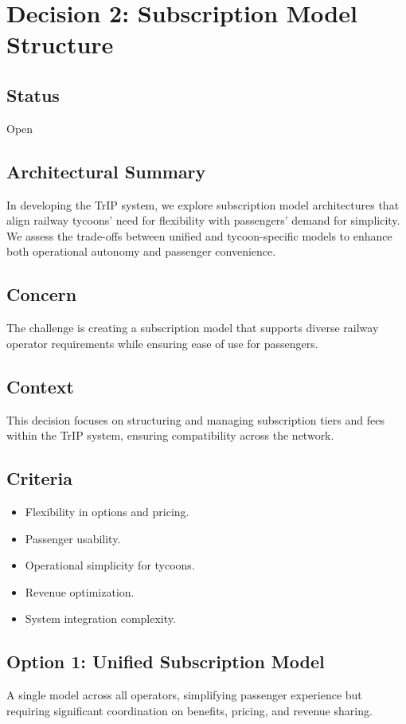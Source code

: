 \section*{Decision 2: Subscription Model Structure}

\subsection*{Status}
Open

\subsection*{Architectural Summary}
In developing the TrIP system, we explore subscription model architectures that align railway tycoons' need for flexibility with passengers' demand for simplicity. We assess the trade-offs between unified and tycoon-specific models to enhance both operational autonomy and passenger convenience.

\subsection*{Concern}
The challenge is creating a subscription model that supports diverse railway operator requirements while ensuring ease of use for passengers.

\subsection*{Context}
This decision focuses on structuring and managing subscription tiers and fees within the TrIP system, ensuring compatibility across the network.

\subsection*{Criteria}
\begin{itemize}
\item Flexibility in options and pricing.
\item Passenger usability.
\item Operational simplicity for tycoons.
\item Revenue optimization.
\item System integration complexity.
\end{itemize}

\subsection*{Option 1: Unified Subscription Model}
A single model across all operators, simplifying passenger experience but requiring significant coordination on benefits, pricing, and revenue sharing.

